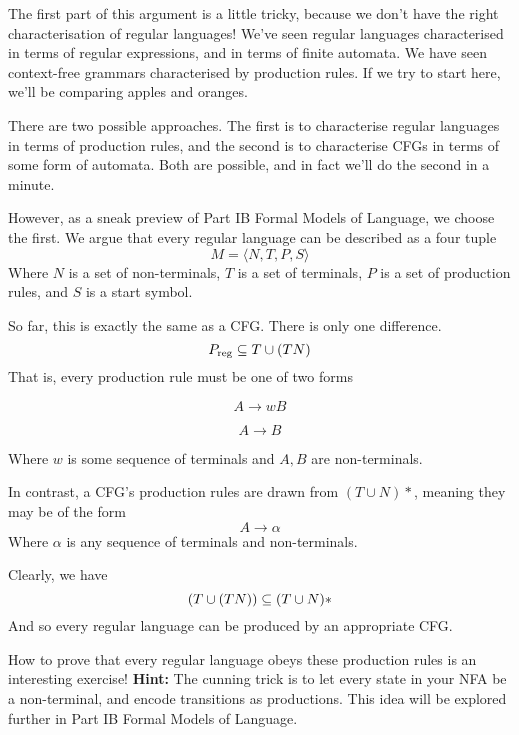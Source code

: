 The first part of this argument is a little tricky, because we don't have the right characterisation of regular languages! We've seen regular languages characterised in terms of regular expressions, and in terms of finite automata. We have seen context-free grammars characterised by production rules. If we try to start here, we'll be comparing apples and oranges.

There are two possible approaches. The first is to characterise regular languages in terms of production rules, and the second is to characterise CFGs in terms of some form of automata. Both are possible, and in fact we'll do the second in a minute. 

However, as a sneak preview of \textsf{Part IB Formal Models of Language}, we choose the first. We argue that every regular language can be described as a four tuple
\[ M= \langle N, T, P, S \rangle \]
Where $N$ is a set of non-terminals, $T$ is a set of terminals, $P$ is a set of production rules, and $S$ is a start symbol. 

So far, this is exactly the same as a CFG. There is only one difference.
\[P_\text{reg} \subseteq T\* \cup (T\*N)\]
That is, every production rule must be one of two forms\\
\begin{minipage}[t]{.5\textwidth}
    \vspace{-3mm}
    \[A \rightarrow wB\]
\end{minipage}%
\begin{minipage}[t]{.5\textwidth}
    \vspace{-3mm}
    \[A \rightarrow B\]
\end{minipage}

Where $w$ is some sequence of terminals and $A, B$ are non-terminals.

In contrast, a CFG's production rules are drawn from $(T \cup N)*$, meaning they may be of the form
\[A \rightarrow \alpha\]
Where $\alpha$ is any sequence of terminals and non-terminals. 

Clearly, we have
\[(T\* \cup (T\*N)) \subseteq (T \cup N)*\]
And so every regular language can be produced by an appropriate CFG.

How to prove that every regular language obeys these production rules is an interesting exercise! \textbf{Hint: } The cunning trick is to let every state in your NFA be a non-terminal, and encode transitions as productions. This idea will be explored further in \textsf{Part IB Formal Models of Language}.

